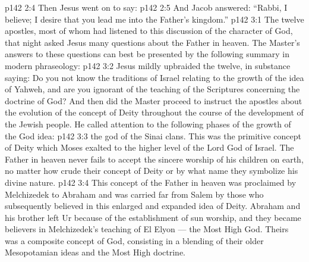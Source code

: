 \vs p142 2:4 \pc Then Jesus went on to say: 
\vs p142 2:5 And Jacob answered: “Rabbi, I believe; I desire that you lead me into the Father’s kingdom.”
\vs p142 3:1 The twelve apostles, most of whom had listened to this discussion of the character of God, that night asked Jesus many questions about the Father in heaven. The Master’s answers to these questions can best be presented by the following summary in modern phraseology:
\vs p142 3:2 Jesus mildly upbraided the twelve, in substance saying: Do you not know the traditions of Israel relating to the growth of the idea of Yahweh, and are you ignorant of the teaching of the Scriptures concerning the doctrine of God? And then did the Master proceed to instruct the apostles about the evolution of the concept of Deity throughout the course of the development of the Jewish people. He called attention to the following phases of the growth of the God idea:
\vs p142 3:3 \bibnobreakspace {} the god of the Sinai clans. This was the primitive concept of Deity which Moses exalted to the higher level of the Lord God of Israel. The Father in heaven never fails to accept the sincere worship of his children on earth, no matter how crude their concept of Deity or by what name they symbolize his divine nature.
\vs p142 3:4 \bibnobreakspace {} This concept of the Father in heaven was proclaimed by Melchizedek to Abraham and was carried far from Salem by those who subsequently believed in this enlarged and expanded idea of Deity. Abraham and his brother left Ur because of the establishment of sun worship, and they became believers in Melchizedek’s teaching of El Elyon --- the Most High God. Theirs was a composite concept of God, consisting in a blending of their older Mesopotamian ideas and the Most High doctrine.
